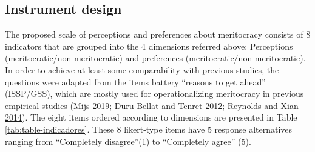 \documentclass[
]{article}
\begin{document}
\hypertarget{instrument-design}{%
\subsection{Instrument design}\label{instrument-design}}

The proposed scale of perceptions and preferences about meritocracy consists of 8 indicators that are grouped into the 4 dimensions referred above: Perceptions (meritocratic/non-meritocratic) and preferences (meritocratic/non-meritocratic). In order to achieve at least some comparability with previous studies, the questions were adapted from the items battery ``reasons to get ahead'' (ISSP/GSS), which are mostly used for operationalizing meritocracy in previous empirical studies (Mijs \protect\hyperlink{ref-mijs_paradox_2019}{2019}; Duru-Bellat and Tenret \protect\hyperlink{ref-duru-bellat_whos_2012}{2012}; Reynolds and Xian \protect\hyperlink{ref-reynolds_perceptions_2014}{2014}). The eight items ordered according to dimensions are presented in Table \ref{tab:table-indicadores}. These 8 likert-type items have 5 response alternatives ranging from ``Completely disagree''(1) to ``Completely agree'' (5).
\end{document}
